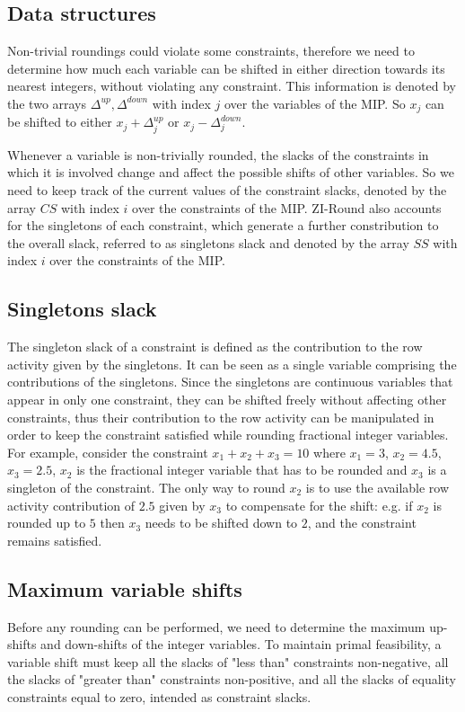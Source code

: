 \documentclass[a4paper,12pt,twoside]{scrbook}
\begin{document}
\subsection{Data structures}
Non-trivial roundings could violate some constraints, therefore we need to determine how much each variable can be shifted in either direction towards its nearest integers, without violating any constraint. This information is denoted by the two arrays $\Delta^{up}, \Delta^{down}$ with index $j$ over the variables of the MIP. So $x_j$ can be shifted to either $x_j + \Delta_{j}^{up}$ or $x_j - \Delta_{j}^{down}$. \par

Whenever a variable is non-trivially rounded, the slacks of the constraints in which it is involved change and affect the possible shifts of other variables. So we need to keep track of the current values of the constraint slacks, denoted by the array $CS$ with index $i$ over the constraints of the MIP.
ZI-Round also accounts for the singletons of each constraint, which generate a further constribution to the overall slack, referred to as singletons slack and denoted by the array $SS$ with index $i$ over the constraints of the MIP. \par 

\subsection{Singletons slack}
The singleton slack of a constraint is defined as the contribution to the row activity given by the singletons. It can be seen as a single variable comprising the contributions of the singletons. 
Since the singletons are continuous variables that appear in only one constraint, they can be shifted freely without affecting other constraints, thus their contribution to the row activity can be manipulated in order to keep the constraint satisfied while rounding fractional integer variables. For example, consider the constraint $x_1 + x_2 + x_3 = 10$ where $x_1 = 3$, $x_2 = 4.5$, $x_3 = 2.5$, $x_2$ is the fractional integer variable that has to be rounded and $x_3$ is a singleton of the constraint. The only way to round $x_2$ is to use the available row activity contribution of $2.5$ given by $x_3$ to compensate for the shift: e.g. if $x_2$ is rounded up to $5$ then $x_3$ needs to be shifted down to $2$, and the constraint remains satisfied. \par 

\subsection{Maximum variable shifts}
Before any rounding can be performed, we need to determine the maximum up-shifts and down-shifts of the integer variables. To maintain primal feasibility, a variable shift must keep all the slacks of "less than" constraints non-negative, all the slacks of "greater than" constraints non-positive, and all the slacks of equality constraints equal to zero, intended as constraint slacks. \par
\end{document}
